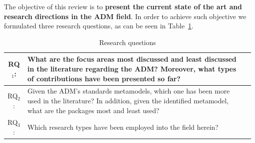 

The objective of this review is to \textbf{present the current state of the art and research directions in the ADM field}. In order to achieve such objective we formulated three research questions, as can be seen in Table~\ref{tab:research_questions}.

\begin{table}
\centering
\caption{Research questions\label{tab:research_questions}}
\begin{tabularx}{
1.0\textwidth}{|c|X|X|}
\hline 
RQ$_1$: & What are the focus areas most discussed and least discussed in the
literature regarding the ADM? Moreover, what types of contributions
have been presented so far?\tabularnewline
\hline 
RQ$_2$: & Given the ADM's standards metamodels, which one has been more used
in the literature? In addition, given the identified metamodel, what
are the packages most and least used?\tabularnewline
\hline 
RQ$_3$: & Which research types have been employed into the field herein?\tabularnewline
\hline 
\end{tabularx}
\end{table}





